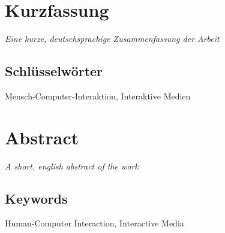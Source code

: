 \documentclass[11pt,    %
  english,ngerman,      %
  paper=a4,             %
  oneside,              %
  tablecaptionbelow,    %
  DIV=calc              %
  ]{scrbook}            %
\newcommand{\imiscomment}[1]{\textit{#1}}
\begin{document}
\chapter*{Kurzfassung}
\thispagestyle{empty}

\imiscomment{Eine kurze, deutschsprachige Zusammenfassung der Arbeit}

\vfill

\section*{Schlüsselwörter} Mensch-Computer-Interaktion, Interaktive Medien


\chapter*{Abstract}
\thispagestyle{empty}

\imiscomment{A short, english abstract of the work}

\vfill

\section*{Keywords} Human-Computer Interaction, Interactive Media

\clearpage
\setcounter{tocdepth}{1}
\tableofcontents

\mainmatter













\end{document}
